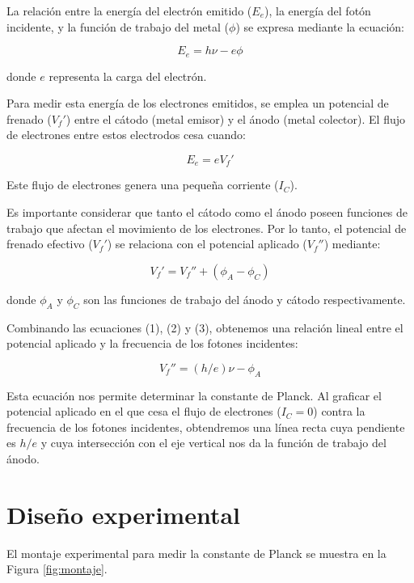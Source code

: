 \documentclass[twocolumn,a4paper,11pt]{scrartcl}
\begin{document}
La relación entre la energía del electrón emitido ($E_e$), la energía del fotón incidente, y la función de trabajo del metal ($\phi$) se expresa mediante la ecuación:

\begin{equation}
E_e = h\nu - e\phi
\end{equation}

donde $e$ representa la carga del electrón.

Para medir esta energía de los electrones emitidos, se emplea un potencial de frenado ($V_f'$) entre el cátodo (metal emisor) y el ánodo (metal colector). El flujo de electrones entre estos electrodos cesa cuando:

\begin{equation}
E_e = eV_f'
\end{equation}

Este flujo de electrones genera una pequeña corriente ($I_C$).

Es importante considerar que tanto el cátodo como el ánodo poseen funciones de trabajo que afectan el movimiento de los electrones. Por lo tanto, el potencial de frenado efectivo ($V_f'$) se relaciona con el potencial aplicado ($V_f''$) mediante:

\begin{equation}
V_f' = V_f'' + (\phi_A - \phi_C)
\end{equation}

donde $\phi_A$ y $\phi_C$ son las funciones de trabajo del ánodo y cátodo respectivamente.

Combinando las ecuaciones (1), (2) y (3), obtenemos una relación lineal entre el potencial aplicado y la frecuencia de los fotones incidentes:

\begin{equation}
V_f'' = (h/e)\nu - \phi_A
\end{equation}

Esta ecuación nos permite determinar la constante de Planck. Al graficar el potencial aplicado en el que cesa el flujo de electrones ($I_C = 0$) contra la frecuencia de los fotones incidentes, obtendremos una línea recta cuya pendiente es $h/e$ y cuya intersección con el eje vertical nos da la función de trabajo del ánodo.

\section{Diseño experimental}

El montaje experimental para medir la constante de Planck se muestra en la Figura \ref{fig:montaje}.
\end{document}

